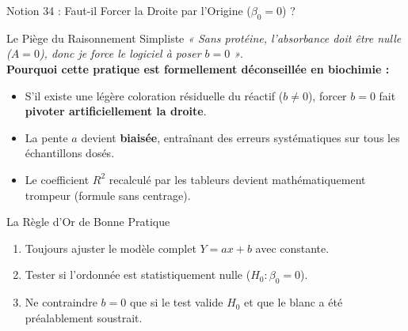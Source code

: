 \documentclass[aspectratio=169,10pt]{beamer}
\begin{document}
\begin{frame}{Notion 34 : Faut-il Forcer la Droite par l'Origine ($\beta_0 = 0$) ?}
  \begin{warnbox}{Le Piège du Raisonnement Simpliste}
    \footnotesize
    \textit{« Sans protéine, l'absorbance doit être nulle ($A = 0$), donc je force le logiciel à poser $b = 0$ »}.\\
    \textbf{Pourquoi cette pratique est formellement déconseillée en biochimie :}
    \begin{itemize}
      \item S'il existe une légère coloration résiduelle du réactif ($b \neq 0$), forcer $b=0$ fait \textbf{pivoter artificiellement la droite}.
      \item La pente $a$ devient \textbf{biaisée}, entraînant des erreurs systématiques sur tous les échantillons dosés.
      \item Le coefficient $R^2$ recalculé par les tableurs devient mathématiquement trompeur (formule sans centrage).
    \end{itemize}
  \end{warnbox}
  \vspace{1mm}
  \begin{takeawaybox}{La Règle d'Or de Bonne Pratique}
    \footnotesize
    \begin{enumerate}
      \item Toujours ajuster le modèle complet $Y = ax + b$ avec constante.
      \item Tester si l'ordonnée est statistiquement nulle ($H_0 : \beta_0 = 0$).
      \item Ne contraindre $b = 0$ que si le test valide $H_0$ et que le blanc a été préalablement soustrait.
    \end{enumerate}
  \end{takeawaybox}
\end{frame}
\end{document}
